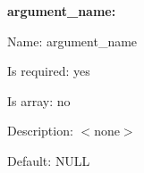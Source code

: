 {\bfseries argument\+\_\+name\+:}


\begin{DoxyItemize}
\item Name\+: argument\+\_\+name
\item Is required\+: yes
\item Is array\+: no
\item Description\+: $<$none$>$
\item Default\+: {\ttfamily N\+U\+L\+L} 
\end{DoxyItemize}